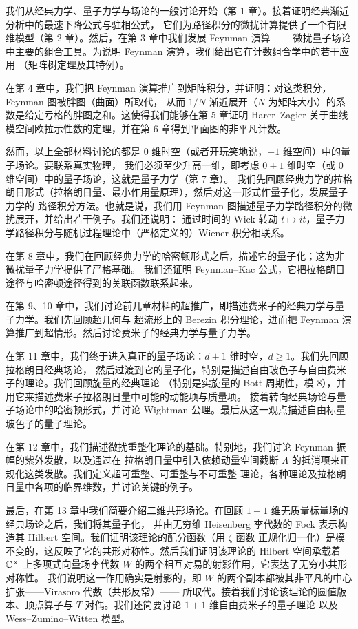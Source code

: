我们从经典力学、量子力学与场论的一般讨论开始（第 1 章）。接着证明经典渐近分析中的最速下降公式与驻相公式，
它们为路径积分的微扰计算提供了一个有限维模型（第 2 章）。然后，在第 3 章中我们发展 Feynman 演算——
微扰量子场论中主要的组合工具。为说明 Feynman 演算，我们给出它在计数组合学中的若干应用
（矩阵树定理及其特例）。

在第 4 章中，我们把 Feynman 演算推广到矩阵积分，并证明：对这类积分，Feynman 图被胖图（曲面）所取代，
从而 $1/N$ 渐近展开（$N$ 为矩阵大小）的系数是给定亏格的胖图之和。这使得我们能够在第 5 章证明
Harer–Zagier 关于曲线模空间欧拉示性数的定理，并在第 6 章得到平面图的非平凡计数。

然而，以上全部材料讨论的都是 $0$ 维时空（或者开玩笑地说，$-1$ 维空间）中的量子场论。要联系真实物理，
我们必须至少升高一维，即考虑 $0+1$ 维时空（或 $0$ 维空间）中的量子场论，这就是量子力学（第 7 章）。
我们先回顾经典力学的拉格朗日形式（拉格朗日量、最小作用量原理），然后对这一形式作量子化，发展量子力学的
路径积分方法。也就是说，我们用 Feynman 图描述量子力学路径积分的微扰展开，并给出若干例子。我们还说明：
通过时间的 Wick 转动 $t\mapsto it$，量子力学路径积分与随机过程理论中（严格定义的）Wiener 积分相联系。

在第 8 章中，我们在回顾经典力学的哈密顿形式之后，描述它的量子化；这为非微扰量子力学提供了严格基础。
我们还证明 Feynman–Kac 公式，它把拉格朗日途径与哈密顿途径得到的关联函数联系起来。

在第 9、10 章中，我们讨论前几章材料的超推广，即描述费米子的经典力学与量子力学。我们先回顾超几何与
超流形上的 Berezin 积分理论，进而把 Feynman 演算推广到超情形。然后讨论费米子的经典力学与量子力学。

在第 11 章中，我们终于进入真正的量子场论：$d+1$ 维时空，$d\ge 1$。我们先回顾拉格朗日经典场论，
然后过渡到它的量子化，特别是描述自由玻色子与自由费米子的理论。我们回顾旋量的经典理论
（特别是实旋量的 Bott 周期性，模 $8$），并用它来描述费米子拉格朗日量中可能的动能项与质量项。
接着转向经典场论与量子场论中的哈密顿形式，并讨论 Wightman 公理。最后从这一观点描述自由标量玻色子的量子理论。

在第 12 章中，我们描述微扰重整化理论的基础。特别地，我们讨论 Feynman 振幅的紫外发散，以及通过在
拉格朗日量中引入依赖动量空间截断 $\Lambda$ 的抵消项来正规化这类发散。我们定义超可重整、可重整与不可重整
理论，各种理论及拉格朗日量中各项的临界维数，并讨论关键的例子。

最后，在第 13 章中我们简要介绍二维共形场论。在回顾 $1+1$ 维无质量标量场的经典场论之后，我们将其量子化，
并由无穷维 Heisenberg 李代数的 Fock 表示构造其 Hilbert 空间。我们证明该理论的配分函数（用 $\zeta$ 函数
正规化归一化）是模不变的，这反映了它的共形对称性。然后我们证明该理论的 Hilbert 空间承载着
$\Bbb C^\times$ 上多项式向量场李代数 $W$ 的两个相互对易的射影作用，它表达了无穷小共形对称性。
我们说明这一作用确实是射影的，即 $W$ 的两个副本都被其非平凡的中心扩张——Virasoro 代数（共形反常）——
所取代。接着我们讨论该理论的圆值版本、顶点算子与 $T$ 对偶。我们还简要讨论 $1+1$ 维自由费米子的量子理论
以及 Wess–Zumino–Witten 模型。

